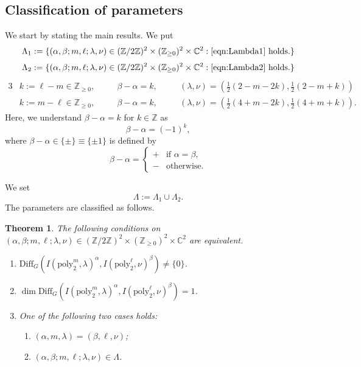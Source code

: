 \documentclass[reqno,11pt]{amsart}
\newtheorem{thm}[equation]{Theorem}
\theoremstyle{remark}
\numberwithin{equation}{section}
\newcommand{\gb}{\beta}
\newcommand{\ga}{\alpha}
\newcommand{\gL}{\Lambda}
\newcommand{\C}{\mathbb{C}}
\newcommand{\Z}{\mathbb{Z}}
\newcommand{\poly}{\mathrm{poly}}
\newcommand{\Diff}{\mathrm{Diff}}
\begin{document}
\subsection{Classification of parameters}
\label{sec:main1}
We start by stating the main results. We put
\begin{align*}
\gL_1
&:=
\{
(\ga, \gb; m, \ell; \lambda,\nu) \in (\Z/2\Z)^2 \times (\Z_{\geq 0})^2 \times \C^2: 
\text{\eqref{eqn:Lambda1} holds.}\}\\[3pt]
\gL_2
&:=
\{
(\ga, \gb; m, \ell; \lambda,\nu) \in (\Z/2\Z)^2 \times (\Z_{\geq 0})^2 \times \C^2: 
\text{\eqref{eqn:Lambda2} holds.}\}
\end{align*}
\begin{alignat}{3}
&k:=\ell-m\in \Z_{\geq 0},
\quad
&&\beta-\alpha = k,
\quad
&&(\lambda,\nu) = (\tfrac{1}{2}(2-m-2k), \tfrac{1}{2}(2-m+k)) \label{eqn:Lambda1}\\[3pt]
&k:=m-\ell\in \Z_{\geq 0},
\quad
&&\beta-\alpha = k,
\quad
&&(\lambda,\nu)=(\tfrac{1}{2}(4+m-2k), \tfrac{1}{2}(4+m+k)).\label{eqn:Lambda2}
\end{alignat}
Here, we understand
$\beta-\ga = k$ for $k \in \Z$ as
\begin{equation}\label{eqn:parity}
\beta-\ga = (-1)^{k},
\end{equation}
where $\beta-\ga \in \{\pm\} \equiv \{\pm 1\}$
is defined by
\begin{equation*}
\beta-\ga=
\begin{cases}
+ & \text{if $\ga = \gb$},\\
- & \text{otherwise}.
\end{cases}
\end{equation*}

We set
\begin{equation*}
\gL:=\gL_1  \cup \gL_2.
\end{equation*}
The parameters are classified as follows.

\begin{thm}\label{thm:IDO1}
The following conditions on 
$(\ga, \gb; m,\ell; \lambda,\nu) \in (\Z/2\Z)^2 \times (\Z_{\geq 0})^2 \times \C^2$ 
are equivalent.
\begin{enumerate}
\item[\emph{(i)}]
$\Diff_G(I(\poly_2^m, \lambda)^\ga, I(\poly_2^\ell,  \nu)^\beta)\neq \{0\}$.

\item[\emph{(ii)}]
$\dim \Diff_G(I(\poly_2^m, \lambda)^\ga, I(\poly_2^\ell,  \nu)^\beta) =1$.

\item[\emph{(iii)}]
One of the following two cases holds:
\begin{enumerate}
\item[\emph{(iii-a)}] $(\ga, m, \lambda) = (\gb, \ell, \nu)$;
\item[\emph{(iii-b)}] $(\ga, \gb; m,\ell; \lambda,\nu) \in \gL$.
\end{enumerate}
\end{enumerate}
\end{thm}
\end{document}
